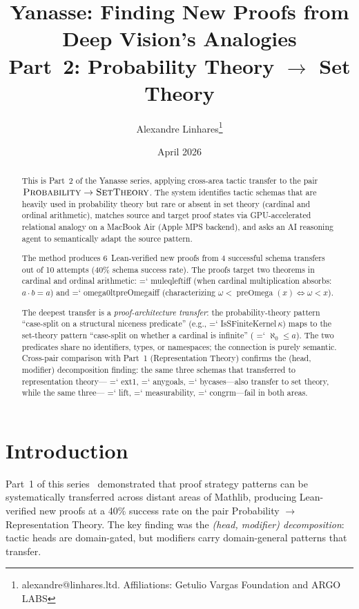 \documentclass[11pt]{article}
\title{Yanasse: Finding New Proofs from Deep Vision's Analogies\\[0.5em]
\large Part~2: Probability Theory $\to$ Set Theory}
\author{Alexandre Linhares\thanks{alexandre@linhares.ltd. Affiliations: Getulio Vargas Foundation and ARGO LABS}}
\date{April 2026}
\renewcommand{\texttt}[1]{%
  \begingroup\ttfamily\hyphenchar\font=`\-\relax
  \def\_{\textunderscore\discretionary{}{}{}}%
  #1\endgroup}
\theoremstyle{definition}
\theoremstyle{remark}
\begin{document}
\maketitle

\begin{abstract}
This is Part~2 of the Yanasse series, applying cross-area tactic
transfer to the pair $\textsc{Probability} \to
\textsc{SetTheory}$.  The system identifies tactic schemas that are
heavily used in probability theory but rare or absent in set
theory (cardinal and ordinal arithmetic), matches source and target
proof states via GPU-accelerated relational analogy on a MacBook Air
(Apple MPS backend), and asks an AI reasoning agent to semantically
adapt the source pattern.

The method produces 6~Lean-verified new proofs from 4 successful
schema transfers out of 10 attempts (40\% schema success rate).  The
proofs target two theorems in cardinal and ordinal arithmetic:
\texttt{mul\_eq\_left\_iff} (when cardinal multiplication absorbs:
$a \cdot b = a$) and \texttt{omega0\_lt\_preOmega\_iff} (characterizing
$\omega < \operatorname{preOmega}(x) \Leftrightarrow \omega < x$).

The deepest transfer is a \emph{proof-architecture transfer}: the
probability-theory pattern ``case-split on a structural niceness
predicate'' (e.g., \texttt{IsSFiniteKernel\,$\kappa$}) maps to the
set-theory pattern ``case-split on whether a cardinal is infinite''
(\texttt{$\aleph_0 \leq a$}).  The two predicates share no
identifiers, types, or namespaces; the connection is purely semantic.
Cross-pair comparison with Part~1 (Representation Theory) confirms the
(head, modifier) decomposition finding: the same three schemas that
transferred to representation theory---\texttt{ext1},
\texttt{any\_goals}, \texttt{by\_cases}---also transfer to set theory,
while the same three---\texttt{lift}, \texttt{measurability},
\texttt{congrm}---fail in both areas.
\end{abstract}

\newpage
\tableofcontents
\newpage

\section{Introduction}\label{sec:intro}

Part~1 of this series~\cite{yanasse_part1} demonstrated that proof
strategy patterns can be systematically transferred across distant areas
of Mathlib, producing Lean-verified new proofs at a 40\% success rate on
the pair Probability $\to$ Representation Theory.  The key finding was
the \emph{(head, modifier) decomposition}: tactic heads are
domain-gated, but modifiers carry domain-general patterns that transfer.
\end{document}
